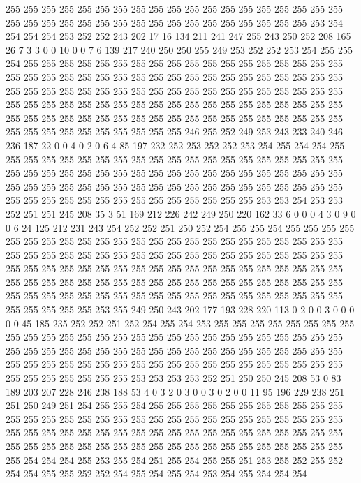 255 255 255 255 255 255 255 255 255 255 255 255 255 255 255 255 255 255 255 255
255 255 255 255 255 255 255 255 255 255 255 255 255 255 255 255 253 254 254 254
254 253 252 252 243 202 17 16 134 211 241 247 255 243 250 252 208 165 26 7
3 3 0 0 10 0 0 7 6 139 217 240 250 250 255 249 253 252 252 253
254 255 255 254 255 255 255 255 255 255 255 255 255 255 255 255 255 255 255 255
255 255 255 255 255 255 255 255 255 255 255 255 255 255 255 255 255 255 255 255
255 255 255 255 255 255 255 255 255 255 255 255 255 255 255 255 255 255 255 255
255 255 255 255 255 255 255 255 255 255 255 255 255 255 255 255 255 255 255 255
255 255 255 255 255 255 255 255 255 255 255 255 255 255 255 255 255 255 255 255
255 255 255 255 255 255 255 255 246 255 252 249 253 243 233 240 246 236 187 22
0 0 4 0 2 0 6 4 85 197 232 252 253 252 252 253 254 255 254 254
255 255 255 255 255 255 255 255 255 255 255 255 255 255 255 255 255 255 255 255
255 255 255 255 255 255 255 255 255 255 255 255 255 255 255 255 255 255 255 255
255 255 255 255 255 255 255 255 255 255 255 255 255 255 255 255 255 255 255 255
255 255 255 255 255 255 255 255 255 255 255 255 253 253 254 253 253 252 251 251
245 208 35 3 51 169 212 226 242 249 250 220 162 33 6 0 0 0 4 3
0 9 0 0 6 24 125 212 231 243 254 252 252 251 250 252 254 255 255 254
255 255 255 255 255 255 255 255 255 255 255 255 255 255 255 255 255 255 255 255
255 255 255 255 255 255 255 255 255 255 255 255 255 255 255 255 255 255 255 255
255 255 255 255 255 255 255 255 255 255 255 255 255 255 255 255 255 255 255 255
255 255 255 255 255 255 255 255 255 255 255 255 255 255 255 255 255 255 255 255
255 255 255 255 255 255 255 255 255 255 255 255 255 255 255 255 255 255 255 255
255 255 255 255 253 255 249 250 243 202 177 193 228 220 113 0 2 0 0 3
0 0 0 0 0 45 185 235 252 252 251 252 254 255 254 253 255 255 255 255
255 255 255 255 255 255 255 255 255 255 255 255 255 255 255 255 255 255 255 255
255 255 255 255 255 255 255 255 255 255 255 255 255 255 255 255 255 255 255 255
255 255 255 255 255 255 255 255 255 255 255 255 255 255 255 255 255 255 255 255
255 255 255 255 255 255 255 255 253 253 253 253 252 251 250 250 245 208 53 0
83 189 203 207 228 246 238 188 53 4 0 3 2 0 3 0 0 3 0 2
0 0 11 95 196 229 238 251 251 250 249 251 254 255 255 254 255 255 255 255
255 255 255 255 255 255 255 255 255 255 255 255 255 255 255 255 255 255 255 255
255 255 255 255 255 255 255 255 255 255 255 255 255 255 255 255 255 255 255 255
255 255 255 255 255 255 255 255 255 255 255 255 255 255 255 255 255 255 255 255
255 255 255 255 255 254 254 254 255 253 255 254 251 255 254 255 255 251 253 255
252 255 252 254 254 255 255 252 252 254 255 254 255 254 253 254 255 254 254 254
